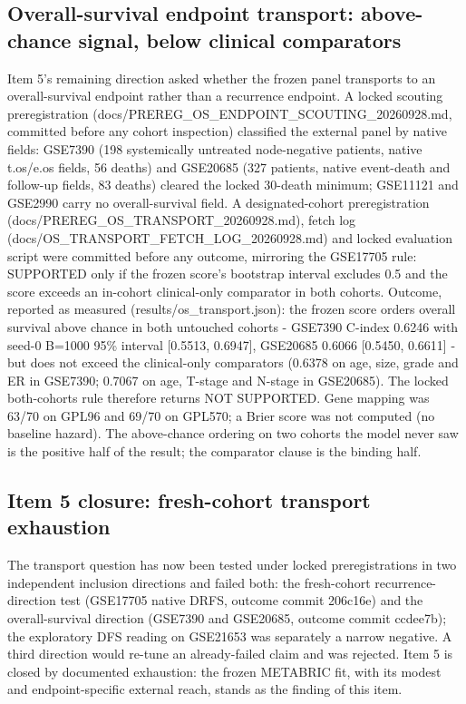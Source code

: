 \documentclass[12pt,a4paper]{article}
\begin{document}
\subsection{Overall-survival endpoint transport: above-chance signal, below clinical comparators}
{\sloppy
Item 5's remaining direction asked whether the frozen panel transports to an
overall-survival endpoint rather than a recurrence endpoint. A locked
scouting preregistration (docs/PREREG\_OS\_ENDPOINT\_SCOUTING\_20260928.md,
committed before any cohort inspection) classified the external panel by
native fields: GSE7390 (198 systemically untreated node-negative patients,
native t.os/e.os fields, 56 deaths) and GSE20685 (327 patients, native
event-death and follow-up fields, 83 deaths) cleared the locked 30-death
minimum; GSE11121 and GSE2990 carry no overall-survival field. A
designated-cohort preregistration (docs/PREREG\_OS\_TRANSPORT\_20260928.md),
fetch log (docs/OS\_TRANSPORT\_FETCH\_LOG\_20260928.md) and locked
evaluation script were committed before any outcome, mirroring the GSE17705
rule: SUPPORTED only if the frozen score's bootstrap interval excludes 0.5
and the score exceeds an in-cohort clinical-only comparator in both
cohorts. Outcome, reported as measured (results/os\_transport.json): the
frozen score orders overall survival above chance in both untouched
cohorts - GSE7390 C-index 0.6246 with seed-0 B=1000 95\% interval
[0.5513, 0.6947], GSE20685 0.6066 [0.5450, 0.6611] - but does not exceed
the clinical-only comparators (0.6378 on age, size, grade and ER in
GSE7390; 0.7067 on age, T-stage and N-stage in GSE20685). The locked
both-cohorts rule therefore returns NOT SUPPORTED. Gene mapping was 63/70
on GPL96 and 69/70 on GPL570; a Brier score was not computed (no baseline
hazard). The above-chance ordering on two cohorts the model never saw is
the positive half of the result; the comparator clause is the binding half.
\par}

\subsection{Item 5 closure: fresh-cohort transport exhaustion}
The transport question has now been tested under locked preregistrations in
two independent inclusion directions and failed both: the fresh-cohort
recurrence-direction test (GSE17705 native DRFS, outcome commit 206c16e)
and the overall-survival direction (GSE7390 and GSE20685, outcome commit
ccdee7b); the exploratory DFS reading on GSE21653 was separately a narrow
negative. A third direction would re-tune an already-failed claim and was
rejected. Item 5 is closed by documented exhaustion: the frozen METABRIC
fit, with its modest and endpoint-specific external reach, stands as the
finding of this item.
\end{document}
